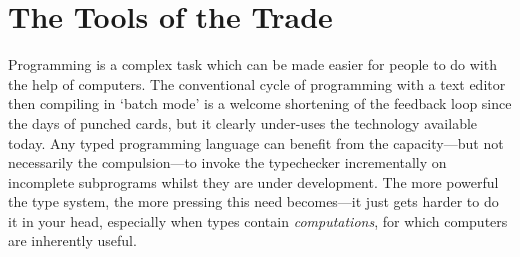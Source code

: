 \documentclass{fundam}
\begin{document}





\section{The Tools of the Trade}
\label{sec:tools}

Programming is a complex task which can be made easier for people to
do with the help of computers. The conventional cycle of programming
with a text editor then compiling in `batch mode' is a welcome
shortening of the feedback loop since the days of punched cards, but it
clearly under-uses the technology available today. Any typed
programming language can benefit from the capacity---but not
necessarily the compulsion---to invoke the typechecker incrementally
on incomplete subprograms whilst they are under development. The more
powerful the type system, the more pressing this need becomes---it just
gets harder to do it in your head, especially when types contain
\emph{computations}, for which computers are inherently useful.
\end{document}

